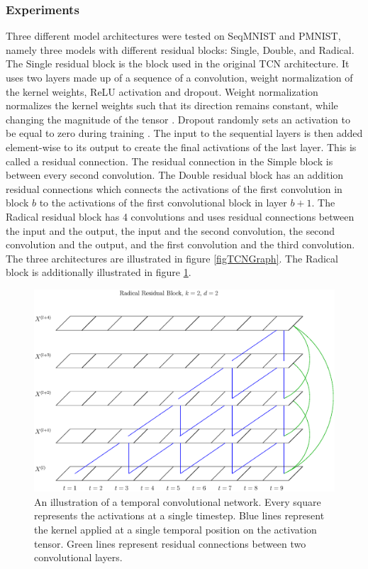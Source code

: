 \documentclass[a4paper, twoside]{article}
\begin{document}
\subsubsection{Experiments}
Three different model architectures were tested on SeqMNIST and PMNIST, namely three models with different residual blocks: Single, Double, and Radical. The Single residual block is the block used in the original TCN \cite{tcn} architecture. It uses two layers made up of a sequence of a convolution, weight normalization of the kernel weights, ReLU activation and dropout. Weight normalization normalizes the kernel weights such that its direction remains constant, while changing the magnitude of the tensor \cite{pytorch}. Dropout randomly sets an activation to be equal to zero during training \cite{cs231n}. The input to the sequential layers is then added element-wise to its output to create the final activations of the last layer. This is called a residual connection. The residual connection in the Simple block is between every second convolution. The Double residual block has an addition residual connections which connects the activations of the first convolution in block $b$ to the activations of the first convolutional block in layer $b+1$. The Radical residual block has 4 convolutions and uses residual connections between the input and the output, the input and the second convolution, the second convolution and the output, and the first convolution and the third convolution. The three architectures are illustrated in figure \ref{figTCNGraph}. The Radical block is additionally illustrated in figure \ref{figTCNRadical}.

\begin{figure}
\begin{center}
    \includegraphics[width=13cm]{figRadical.eps}\caption{An illustration of a temporal convolutional network. Every square represents the activations at a single timestep. Blue lines represent the kernel applied at a single temporal position on the activation tensor. Green lines represent residual connections between two convolutional layers.}\label{figTCNRadical}
\end{center}
\end{figure}
\end{document}

